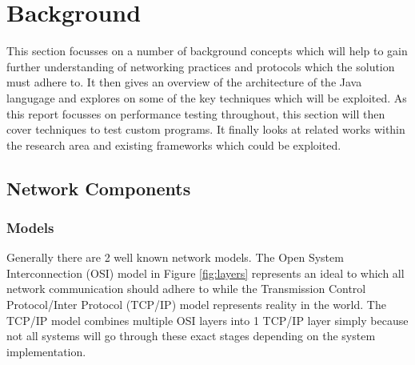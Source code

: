 \documentclass[final_report.tex]{subfiles}
\begin{document}

\section{Background}

This section focusses on a number of background concepts which will help to gain further understanding of networking practices and protocols which the solution must adhere to. It then gives an overview of the architecture of the Java langugage and explores on some of the key techniques which will be exploited. As this report focusses on performance testing throughout, this section will then cover techniques to test custom programs. It finally looks at related works within the research area and existing frameworks which could be exploited.

\subsection{Network Components}


\subsubsection{Models}
\label{sec:models}
Generally there are 2 well known network models. The Open System Interconnection (OSI) model in Figure \ref{fig:layers} represents an ideal to which all network communication should adhere to while the Transmission Control Protocol/Inter Protocol (TCP/IP) model represents reality in the world. The TCP/IP model combines multiple OSI layers into 1 TCP/IP layer simply because not all systems will go through these exact stages depending on the system implementation.
\end{document}
